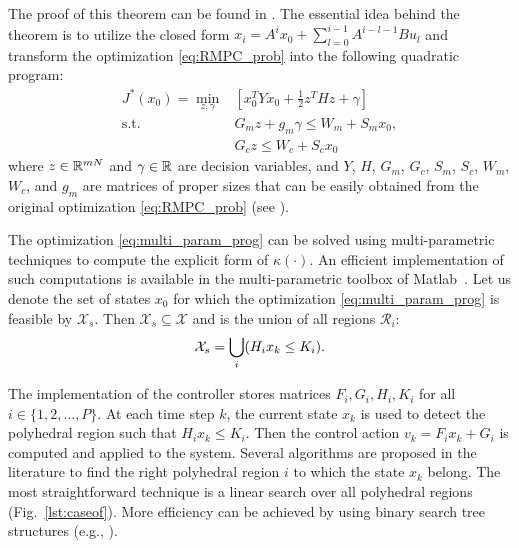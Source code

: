 The proof of this theorem can be found in \cite{delaPea:2005}. The essential idea behind the theorem is to utilize the closed form $x_i=A^ix_0+\sum_{l=0}^{i-1}A^{i-l-1}Bu_l$ and transform the optimization \eqref{eq:RMPC_prob} into the following quadratic program:
\begin{align}
\label{eq:multi_param_prog}
J^{\ast}(x_0)=\min_{z,\gamma}& \left[x_0^TYx_0+\frac{1}{2}z^THz+\gamma\right]\\
\text{s.t.} \quad &G_mz+g_m\gamma\leq W_m+S_mx_0,\nonumber\\
&G_cz\leq W_c+S_cx_0\nonumber
\end{align}
where $z\in \mathbb{R}^{mN}$ and $\gamma\in\mathbb{R}$ are decision variables, and $Y$, $H$, $G_m$, $G_c$, $S_m$, $S_c$, $W_m$, $W_c$, and $g_m$ 
are matrices of proper sizes that can be easily obtained from the original optimization \eqref{eq:RMPC_prob}  (see \cite{delaPea:2005}).


The optimization \eqref{eq:multi_param_prog} can be solved using multi-parametric techniques to compute the explicit form of $\kappa(\cdot)$.
An efficient implementation of such computations is available in the multi-parametric toolbox of Matlab~\cite{matlabMPT, matlabYALMIP}.
Let us denote the set of states $x_0$ for which the optimization  \eqref{eq:multi_param_prog} is feasible by $\mathcal X_s$. Then $\mathcal X_s\subseteq \mathcal X$ and is the union of all regions $\mathcal{R}_{i}$:
\begin{equation}
\mathcal X_s = \bigcup_{i}(H_{i}x_{k}\leq K_{i}).
\end{equation}


The implementation of the controller stores matrices $F_i,G_i,H_i,K_i$ for all $i\in\{1,2,\ldots,P\}$. 
At each time step $k$, the current state $x_k$ is used to detect the polyhedral region 
such that $H_i x_k\le K_i$. Then the control action $v_k = F_i x_k + G_i$ is computed and applied to the system.
Several algorithms are proposed in the literature \cite{Mnnigmann:2011,Jones:2006} to find the right polyhedral region $i$ to which the state $x_k$ belong. 
The most straightforward technique is a linear search over all polyhedral regions (Fig.~\ref{lst:caseof}).
More efficiency can be achieved by using binary search tree structures (e.g., \cite{Mnnigmann:2011}).


